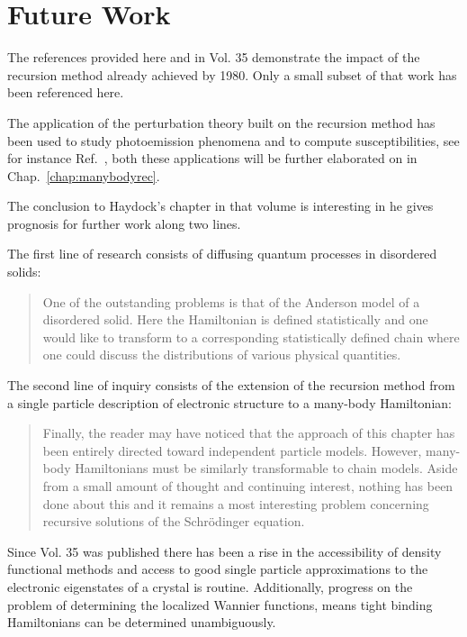 \section{Future Work}
The references provided here and in Vol. 35 demonstrate the impact of
the recursion method already achieved by 1980. Only a small subset of that
work has been referenced here. 

The application of the perturbation theory built on the recursion method 
has been used to study photoemission phenomena \cite{mclean77}
and to compute susceptibilities, see for instance Ref.~\cite{terakura78},
both these applications will be further elaborated on in Chap.~\ref{chap:manybodyrec}.

The conclusion to Haydock's chapter in that volume is interesting in he gives 
prognosis for further work along two lines. 

The first line of research consists of diffusing quantum processes in disordered
solids:
%
\begin{quote}
One of the outstanding problems is that of the Anderson model
of a disordered solid. Here the Hamiltonian is defined statistically and
one would like to transform to a corresponding statistically defined chain where
one could discuss the distributions of various physical quantities.
\end{quote}
%

The second line of inquiry consists of the extension of the recursion method
from a single particle description of electronic structure to a many-body Hamiltonian:
%
\begin{quote}
Finally, the reader may have noticed that the approach of this chapter has been entirely directed
toward independent particle models. However, many-body Hamiltonians must be similarly 
transformable to chain models. Aside from a small amount of thought and continuing interest, 
nothing has been done about this and it remains a most interesting problem concerning recursive 
solutions of the Schr\"odinger equation.
\end{quote}

Since Vol. 35 was published there has been a rise in the accessibility of density functional methods 
and access to good single particle approximations to the electronic eigenstates of a crystal
is routine. Additionally, progress on the problem of determining the localized Wannier functions, 
means tight binding Hamiltonians can be determined unambiguously.

